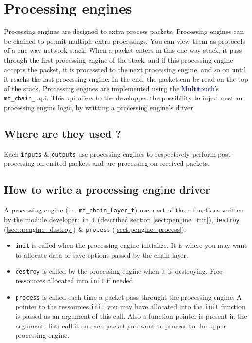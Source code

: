 \chapter{Processing engines}

Processing engines are designed to extra process packets. Processing
engines can be chained to permit multiple extra processings. You can
view them as protocols of a one-way network stack. When a packet
enters in this one-way stack, it pass through the first processing engine 
of the stack, and if this processing engine accepts the packet, it is 
processted to the next processing engine, and so on until it reachs the
last processing engine. In the end, the packet can be read on the top of 
the stack.
Processing engines are implemented using the 
\textcolor{darkblue}{Multitouch}'s \texttt{mt\_chain\_} api. This api
offers to the developper the possibility to inject custom processing engine 
logic, by writting a processing engine's driver.

%
%
\section{Where are they used ?}

Each \texttt{inputs} \& \texttt{outputs} use processing engines to 
respectively perform post-processing on emited packets and 
pre-processing on received packets. 

%
%
\section{How to write a processing engine driver}

A processing engine (i.e. \texttt{mt\_chain\_layer\_t}) use a set of three 
functions written by the module developer: \texttt{init} 
(described section \ref{sect:pengine_init}), \texttt{destroy} 
(\ref{sect:pengine_destroy}) 
\& \texttt{process} (\ref{sect:pengine_process}).

\begin{itemize}
\item \texttt{init} is called when the processing engine 
initialize. It is where you may want to allocate data or save options 
passed by the chain layer.
\item \texttt{destroy} is called by the processing engine when it 
is destroying. Free ressources allocated into \texttt{init} if
needed.
\item \texttt{process} is called each time a packet pass throught 
the processing engine. A pointer to the ressources \texttt{init} you may have
allocated into the \texttt{init} function is passed as an argument of this 
call. Also a function pointer is present in the arguments list: call it on
each packet you want to process to the upper processing engine.
\end{itemize}

